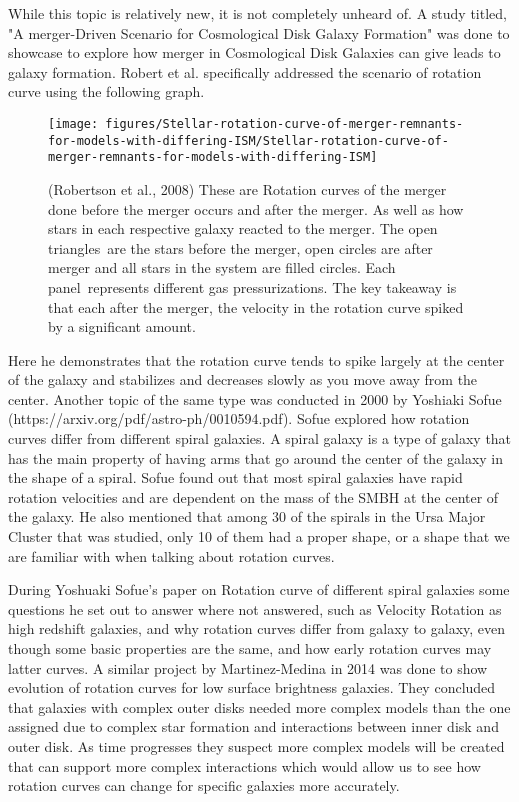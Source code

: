 \documentclass[modern]{aastex61}
\providecommand\citep{\cite}
\begin{document}
While this topic is relatively new, it is not completely unheard of. A study titled, "A merger-Driven Scenario for Cosmological Disk Galaxy Formation" \citep{article} was done to showcase to explore how merger in Cosmological Disk Galaxies can give leads to galaxy formation. Robert et al. specifically addressed the scenario of rotation curve using the following graph.
\begin{figure}[h!]
\begin{center}
\texttt{[image: figures/Stellar-rotation-curve-of-merger-remnants-for-models-with-differing-ISM/Stellar-rotation-curve-of-merger-remnants-for-models-with-differing-ISM]}
\caption{{(Robertson et al., 2008) These are Rotation curves of the merger done
before the merger occurs and after the merger. As well as how stars in
each respective galaxy reacted to the merger. The open triangles~are the
stars before the merger, open circles are after merger and all stars in
the system are filled circles. Each panel~represents different gas
pressurizations. The key takeaway is that each after the merger, the
velocity in the rotation curve spiked by a significant amount. ~
{\label{502600}}%
}}
\end{center}
\end{figure}




Here he demonstrates that the rotation curve tends to spike largely at the center of the galaxy and stabilizes and decreases slowly as you move away from the center. Another topic of the same type was conducted in 2000 by Yoshiaki Sofue (https://arxiv.org/pdf/astro-ph/0010594.pdf). Sofue explored how rotation curves differ from different spiral galaxies. A spiral galaxy is a type of galaxy that has the main property of having arms that go around the center of the galaxy in the shape of a spiral. Sofue found out that most spiral galaxies have rapid rotation velocities and are dependent on the mass of the SMBH at the center of the galaxy. He also mentioned that among 30 of the spirals in the Ursa Major Cluster that was studied, only 10 of them had a proper shape, or a shape that we are familiar with when talking about rotation curves. 

During Yoshuaki Sofue's paper on Rotation curve of different spiral galaxies \citep{Sofue_2001} some questions he set out to answer where not answered, such as Velocity Rotation as high redshift galaxies, and why rotation curves differ from galaxy to galaxy, even though some basic properties are the same, and how early rotation curves may latter curves. A similar project by Martinez-Medina in 2014 was done \citep{Martinez_Medina_2014} to show evolution of rotation curves for low surface brightness galaxies. They concluded that galaxies with complex outer disks needed more complex models than the one assigned due to complex star formation and interactions between inner disk and outer disk. As time progresses they suspect more complex models will be created that can support more complex interactions which would allow us to see how rotation curves can change for specific galaxies more accurately. 
\end{document}
